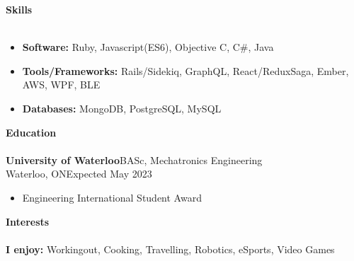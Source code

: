 \documentclass[a4paper]{article}
\newcommand{\lineunder} {
    \vspace{-8pt} \\
    \hspace{-18pt} \hrulefill \\
}
\newcommand{\header} [1] {
    {\hspace{-18pt}\vspace*{6pt} \textcolor{headerGray}{\textbf{\large{#1}}}}
    \vspace{-6pt} \lineunder
}
\begin{document}
\header{Skills}
\vspace{-2.5mm}
\begin{itemize}[leftmargin=*]\itemsep -0.5pt
	\item \textbf{Software: } Ruby, Javascript(ES6), Objective C, C\#, Java\\
	\item \textbf{Tools/Frameworks: } Rails/Sidekiq, GraphQL, React/ReduxSaga, Ember, AWS, WPF, BLE\\
	\item \textbf{Databases: } MongoDB, PostgreSQL, MySQL
\end{itemize}

\header{Education}
\textbf{\normalsize University of Waterloo}\hfill BASc, Mechatronics Engineering\\
\textcolor{educationGray}{\small Waterloo, ON\hfill Expected May 2023}
\vspace{-2mm}
\begin{itemize}[leftmargin=1cm]\itemsep -0.5pt
	\item Engineering International Student Award
\end{itemize}
\vspace{1mm}

\header{Interests}
\textbf{I enjoy: } Workingout, Cooking, Travelling, Robotics, eSports, Video Games\\
\vspace{1cm}
\end{document}
